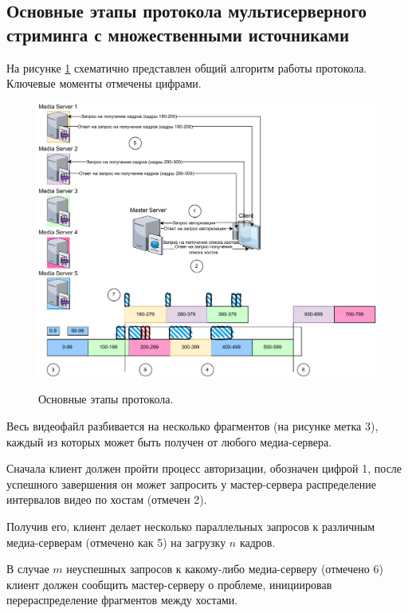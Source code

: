 \subsection{Основные этапы протокола мультисерверного стриминга с множественными источниками}
На рисунке \ref{image:general_process} схематично представлен общий алгоритм работы протокола. Ключевые моменты отмечены цифрами.

\begin{figure}[h]
	\begin{center}
		{\includegraphics[scale = 0.8]{img/[all process].pdf}}
		\caption{Основные этапы протокола.}
		\label{image:general_process}
	\end{center}
\end{figure}

\pagebreak

Весь видеофайл разбивается на несколько фрагментов (на рисунке метка 3), каждый из которых может быть получен от любого медиа-сервера.

Сначала клиент должен пройти процесс авторизации, обозначен цифрой 1, после успешного завершения он может запросить у мастер-сервера распределение интервалов видео по хостам (отмечен 2). 

Получив его, клиент делает несколько параллельных запросов к различным медиа-серверам (отмечено как 5) на загрузку $n$ кадров.

В случае $m$ неуспешных запросов к какому-либо медиа-серверу (отмечено 6) клиент должен сообщить мастер-серверу о проблеме, инициировав перераспределение фрагментов между хостами. 

